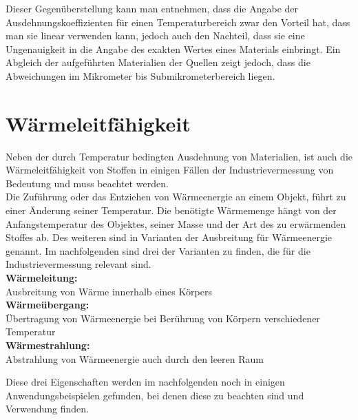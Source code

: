 Dieser Gegenüberstellung kann man entnehmen, dass die Angabe der Ausdehnungskoeffizienten für einen Temperaturbereich zwar den Vorteil hat, dass man sie linear verwenden kann, jedoch auch den Nachteil, dass sie eine Ungenauigkeit in die Angabe des exakten Wertes eines Materials einbringt. Ein Abgleich der aufgeführten Materialien der Quellen zeigt jedoch, dass die Abweichungen im Mikrometer bis Submikrometerbereich liegen.

\section{Wärmeleitfähigkeit}\label{sec:Wärmeleitfähigkeit}

Neben der durch Temperatur bedingten Ausdehnung von Materialien, ist auch die Wärmeleitfähigkeit von Stoffen in einigen Fällen der Industrievermessung von Bedeutung und muss beachtet werden.\\
Die Zuführung oder das Entziehen von Wärmeenergie an einem Objekt, führt zu einer Änderung seiner Temperatur. Die benötigte Wärmemenge hängt von der Anfangstemperatur des Objektes, seiner Masse und der Art des zu erwärmenden Stoffes ab.
Des weiteren sind in \cite{Lindner2006} Varianten der Ausbreitung für Wärmeenergie genannt. Im nachfolgenden sind drei der Varianten zu finden, die für die Industrievermessung relevant sind.\\
\newline
\textbf{Wärmeleitung:}\\
Ausbreitung von Wärme innerhalb eines Körpers\\
\newline
\textbf{Wärmeübergang:}\\
Übertragung von Wärmeenergie bei Berührung von Körpern verschiedener Temperatur\\
\newline
\textbf{Wärmestrahlung:}\\
Abstrahlung von Wärmeenergie auch durch den leeren Raum\\
\newline

Diese drei Eigenschaften werden im nachfolgenden noch in einigen Anwendungsbeispielen gefunden, bei denen diese zu beachten sind und Verwendung finden.\\

